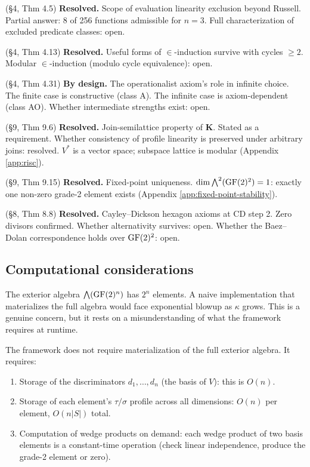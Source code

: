 \begin{description}[nosep]
  \item[O1] (\S4, Thm 4.5) \textbf{Resolved.} Scope of evaluation linearity
    exclusion beyond Russell. Partial answer: 8 of 256
    functions admissible for $n = 3$. Full characterization
    of excluded predicate classes: open.
  \item[O2] (\S4, Thm 4.13) \textbf{Resolved.} Useful forms of
    $\in$-induction survive with cycles $\geq 2$.
    Modular $\in$-induction (modulo cycle equivalence):
    open.
  \item[O3] (\S4, Thm 4.31) \textbf{By design.} The operationalist axiom's
    role in infinite choice. The finite case is constructive
    (class \textsf{A}). The infinite case is axiom-dependent
    (class \textsf{AO}). Whether intermediate strengths
    exist: open.
  \item[O4] (\S9, Thm 9.6) \textbf{Resolved.} Join-semilattice property of
    $\mathbf{K}$. Stated as a requirement. Whether
    consistency of profile linearity is preserved under
    arbitrary joins: resolved. $V^*$ is a vector space;
subspace lattice is modular (Appendix \ref{app:risc}).
  \item[O5] (\S9, Thm 9.15) \textbf{Resolved.} Fixed-point
    uniqueness. $\dim \bigwedge^2(\operatorname{GF}(2)^2) = 1$:
    exactly one non-zero grade-2 element exists
    (Appendix \ref{app:fixed-point-stability}).
  \item[O6] (\S8, Thm 8.8) \textbf{Resolved.} Cayley--Dickson hexagon axioms
    at CD step 2. Zero divisors confirmed. Whether
    alternativity survives: open. Whether the Baez--Dolan
    correspondence holds over $\operatorname{GF}(2)^2$: open.
\end{description}

\subsection{Computational considerations}

The exterior algebra $\bigwedge(\operatorname{GF}(2)^n)$ has $2^n$
elements. A naive implementation that materializes the
full algebra would face exponential blowup as $\kappa$
grows. This is a genuine concern, but it rests on a
misunderstanding of what the framework requires at
runtime.

The framework does not require materialization of the
full exterior algebra. It requires:
\begin{enumerate}[label=(\roman*),nosep]
  \item Storage of the discriminators $d_1, \ldots, d_n$
    (the basis of $V$): this is $O(n)$.
  \item Storage of each element's $\tau/\sigma$ profile
    across all dimensions: $O(n)$ per element, $O(n|S|)$
    total.
  \item Computation of wedge products on demand: each
    wedge product of two basis elements is a constant-time
    operation (check linear independence, produce the
    grade-2 element or zero).
\end{enumerate}

